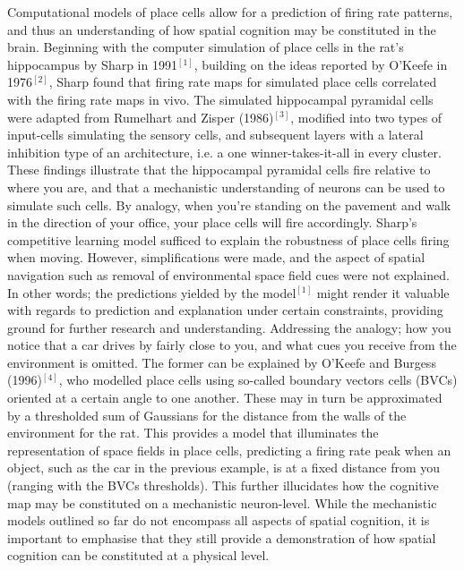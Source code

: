 Computational models of place cells allow for a prediction of firing rate patterns, and thus an understanding of how spatial cognition may be constituted in the brain. Beginning with the computer simulation of place cells in the rat’s hippocampus by Sharp in 1991$^{[1]}$, building on the ideas reported by O’Keefe in 1976$^{[2]}$, Sharp found that firing rate maps for simulated place cells correlated with the firing rate maps in vivo. The simulated hippocampal pyramidal cells were adapted from Rumelhart and Zisper (1986)$^{[3]}$, modified into two types of input-cells simulating the sensory cells, and subsequent layers with a lateral inhibition type of an architecture, i.e. a one winner-takes-it-all in every cluster. These findings illustrate that the hippocampal pyramidal cells fire relative to where you are, and that a mechanistic understanding of neurons can be used to simulate such cells. By analogy, when you’re standing on the pavement and walk in the direction of your office, your place cells will fire accordingly. Sharp’s competitive learning model sufficed to explain the robustness of place cells firing when moving. However, simplifications were made, and the aspect of spatial navigation such as removal of environmental space field cues were not explained. In other words; the predictions yielded by the model$^{[1]}$ might render it valuable with regards to prediction and explanation under certain constraints, providing ground for further research and understanding. Addressing the analogy; how you notice that a car drives by fairly close to you, and what cues you receive from the environment is omitted. The former can be explained by O’Keefe and Burgess (1996)$^{[4]}$, who modelled place cells using so-called boundary vectors cells (BVCs) oriented at a certain angle to one another. These may in turn be approximated by a thresholded sum of Gaussians for the distance from the walls of the environment for the rat. This provides a model that illuminates the representation of space fields in place cells, predicting a firing rate peak when an object, such as the car in the previous example, is at a fixed distance from you (ranging with the BVCs thresholds). This further illucidates how the cognitive map may be constituted on a mechanistic neuron-level. While the mechanistic models outlined so far do not encompass all aspects of spatial cognition, it is important to emphasise that they still provide a demonstration of how spatial cognition can be constituted at a physical level.

